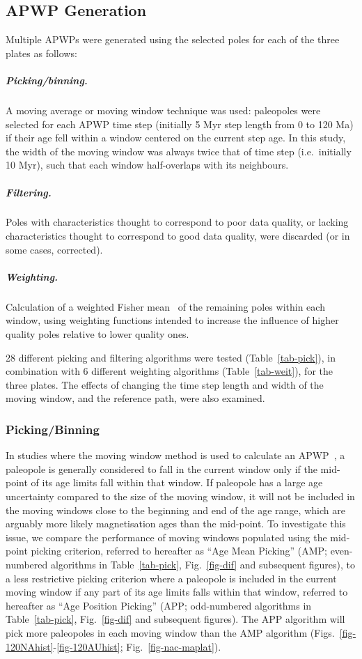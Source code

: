\subsection{APWP Generation}

Multiple APWPs were generated using the selected poles for each of the three
plates as follows:

\subparagraph{Picking/binning.} A moving average or moving window technique
was used: paleopoles were selected for each APWP time step (initially 5 Myr
step length from 0 to 120 Ma) if their age fell within a window centered on the
current step age. In this study, the width of the moving window was always twice
that of time step (i.e.\ initially 10 Myr), such that each window half-overlaps
with its neighbours.

\subparagraph{Filtering.} Poles with characteristics thought to correspond to
poor data quality, or lacking characteristics thought to correspond to good
data quality, were discarded (or in some cases, corrected).

\subparagraph{Weighting.} Calculation of a weighted Fisher mean~\cite{F53} of
the remaining poles within each window, using weighting functions intended to
increase the influence of higher quality poles relative to lower quality ones.

28 different picking and filtering algorithms were tested
(Table~\ref{tab-pick}), in combination with 6 different weighting algorithms
(Table~\ref{tab-weit}), for the three plates. The effects of changing the time
step length and width of the moving window, and the reference path, were also
examined.

\subsubsection{Picking/Binning}

In studies where the moving window method is used to calculate an
APWP~\cite{T99,T08}, a paleopole is generally considered to fall in the
current window only if the mid-point of its age limits fall within that window.
If paleopole has a large age uncertainty compared to the size of the moving
window, it will not be included in the moving windows close to the beginning and
end of the age range, which are arguably more likely magnetisation ages than the
mid-point. To investigate this issue, we compare the performance of moving
windows populated using the mid-point picking criterion, referred to hereafter
as ``Age Mean Picking'' (AMP; even-numbered algorithms in Table~\ref{tab-pick},
Fig.~\ref{fig-dif} and subsequent figures), to a less restrictive picking
criterion where a paleopole is included in the current moving window if any part
of its age limits falls within that window, referred to hereafter as ``Age
Position Picking'' (APP; odd-numbered algorithms in Table~\ref{tab-pick},
Fig.~\ref{fig-dif} and subsequent figures). The APP algorithm will pick more
paleopoles in each moving window than the AMP algorithm
(Figs.~\ref{fig-120NAhist}-\ref{fig-120AUhist}; Fig.~\ref{fig-nac-maplat}).

